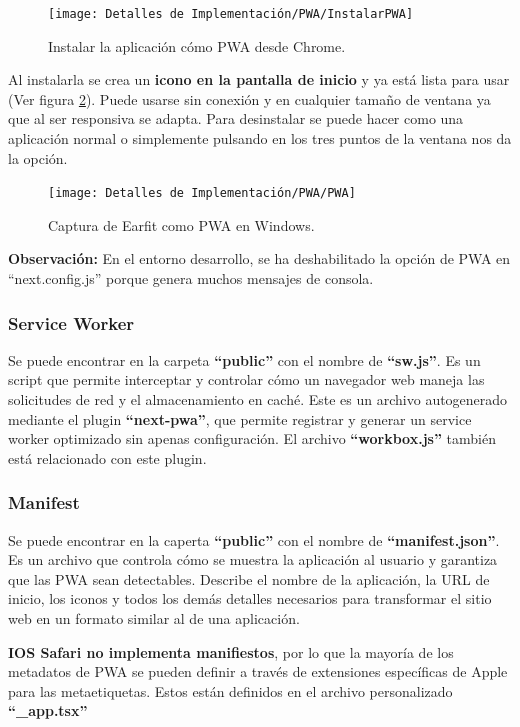 \documentclass[12pt,twoside,titlepage]{report}
\begin{document}
\begin{figure}[H]
    \centering
    \texttt{[image: Detalles de Implementación/PWA/InstalarPWA]}
    \caption{Instalar la aplicación cómo PWA desde Chrome.}
    \label{fig:InstalarPWA}
\end{figure}

Al instalarla se crea un \textbf{icono en la pantalla de inicio} y ya está lista para usar (Ver figura \ref{fig:PWA}). Puede usarse sin conexión y en cualquier tamaño de ventana ya que al ser responsiva se adapta. Para desinstalar se puede hacer como una aplicación normal o simplemente pulsando en los tres puntos de la ventana nos da la opción.

\begin{figure}[H]
    \centering
    \texttt{[image: Detalles de Implementación/PWA/PWA]}
    \caption{Captura de Earfit como PWA en Windows.}
    \label{fig:PWA}
\end{figure}

\textbf{Observación:} En el entorno desarrollo, se ha deshabilitado la opción de PWA en ``next.config.js'' porque genera muchos mensajes de consola.

\subsubsection{Service Worker}
Se puede encontrar en la carpeta \textbf{``public''} con el nombre de \textbf{``sw.js''}. Es un script que permite interceptar y controlar cómo un navegador web maneja las solicitudes de red y el almacenamiento en caché. Este es un archivo autogenerado mediante el plugin \textbf{``next-pwa''}, que permite registrar y generar un service worker optimizado sin apenas configuración. El archivo \textbf{``workbox.js''} también está relacionado con este plugin.

\subsubsection{Manifest}
Se puede encontrar en la caperta \textbf{``public''} con el nombre de \textbf{``manifest.json''}. Es un archivo que controla cómo se muestra la aplicación al usuario y garantiza que las PWA sean detectables. Describe el nombre de la aplicación, la URL de inicio, los iconos y todos los demás detalles necesarios para transformar el sitio web en un formato similar al de una aplicación. 

\textbf{IOS Safari no implementa manifiestos}, por lo que la mayoría de los metadatos de PWA se pueden definir a través de extensiones específicas de Apple para las metaetiquetas. Estos están definidos en el archivo personalizado \textbf{``\_app.tsx''}
\end{document}
